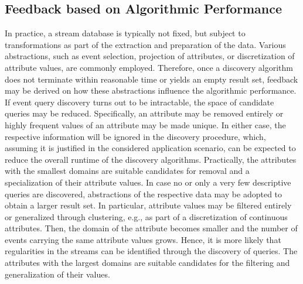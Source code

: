 \subsection{Feedback based on Algorithmic Performance}
\label{sec:feedback}
In practice, a stream database is
typically not fixed, but subject to transformations as part of the extraction
and preparation of the data. Various abstractions, such as
event selection, projection of attributes, or discretization
of attribute values, are commonly employed. Therefore, once a discovery
algorithm does not terminate within
reasonable time or yields an empty result set, feedback may be derived on
how these abstractions influence the algorithmic performance.
If event query discovery turns out to be intractable, the space of
candidate queries may be reduced. Specifically, an
attribute may be removed entirely or highly frequent values of an attribute
may be made unique. In either case, the respective information will be
ignored in the discovery procedure, which, assuming it is justified in the
considered application scenario, can be expected to reduce the overall
runtime of the discovery algorithms. Practically, the attributes with the
smallest domains are suitable candidates for removal and a specialization of
their attribute values.
 In case no or only a very
few descriptive queries are discovered, abstractions
of the respective data may be adopted to obtain a larger result set. In
particular, attribute values may be filtered entirely or generalized through
clustering, e.g., as part of a
discretization of continuous attributes. Then, the
domain of the attribute becomes smaller and the number of events carrying
the same attribute values grows. Hence, it is more likely that regularities
in the streams can be identified through the discovery of queries.
The attributes with the largest domains are suitable candidates for the
filtering and generalization of their values.